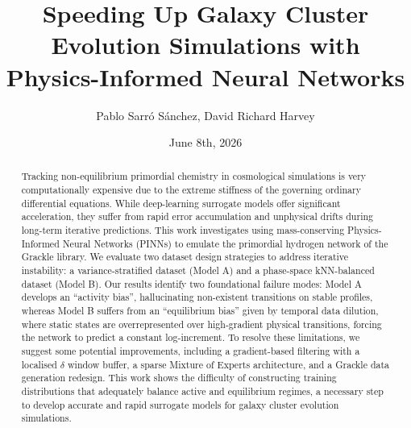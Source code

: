 \documentclass[10pt,a4paper]{article}
\title{Speeding Up Galaxy Cluster Evolution Simulations with Physics-Informed Neural Networks}
\author{Pablo Sarró Sánchez, David Richard Harvey}
\date{June 8th, 2026}
\begin{document}

 


\makeatletter %
\begin{center}
    \Large \textbf{\textsc{\@title}}\\[4pt]
\end{center}
\begin{center}
  {\normalsize \@author \par}
  \vspace{0.2em}
  {\small \@date \par}
\end{center}
\makeatother %


\begin{abstract}
Tracking non-equilibrium primordial chemistry in cosmological simulations is very computationally expensive due to the extreme stiffness of the governing ordinary differential equations. While deep-learning surrogate models offer significant acceleration, they suffer from rapid error accumulation and unphysical drifts during long-term iterative predictions. This work investigates using mass-conserving Physics-Informed Neural Networks (PINNs) to emulate the primordial hydrogen network of the Grackle library. We evaluate two dataset design strategies to address iterative instability: a variance-stratified dataset (Model A) and a phase-space kNN-balanced dataset (Model B). Our results identify two foundational failure modes: Model A develops an ``activity bias'', hallucinating non-existent transitions on stable profiles, whereas Model B suffers from an ``equilibrium bias'' given by temporal data dilution, where static states are overrepresented over high-gradient physical transitions, forcing the network to predict a constant log-increment. To resolve these limitations, we suggest some potential improvements, including a gradient-based filtering with a localised $\delta$ window buffer, a sparse Mixture of Experts architecture, and a Grackle data generation redesign. This work shows the difficulty of constructing training distributions that adequately balance active and equilibrium regimes, a necessary step to develop accurate and rapid surrogate models for galaxy cluster evolution simulations.
\end{abstract}
\end{document}
